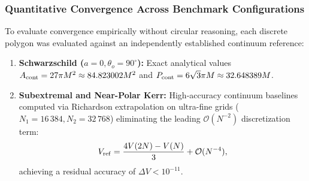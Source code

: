 \subsubsection{Quantitative Convergence Across Benchmark Configurations}
To evaluate convergence empirically without circular reasoning, each discrete polygon was evaluated against an independently established continuum reference:
\begin{enumerate}
    \item \textbf{Schwarzschild ($a = 0, \theta_o = 90^\circ$):} Exact analytical values $A_{\rm cont} = 27\pi M^2 \approx 84.823002M^2$ and $P_{\rm cont} = 6\sqrt{3}\pi M \approx 32.648389M$.
    \item \textbf{Subextremal and Near-Polar Kerr:} High-accuracy continuum baselines computed via Richardson extrapolation on ultra-fine grids ($N_1 = 16\,384, N_2 = 32\,768$) eliminating the leading $\mathcal{O}(N^{-2})$ discretization term:
    \begin{equation}
        V_{\rm ref} = \frac{4V(2N) - V(N)}{3} + \mathcal{O}(N^{-4}),
        \label{eq:richardson_extrap}
    \end{equation}
    achieving a residual accuracy of $\Delta V < 10^{-11}$.
\end{enumerate}

